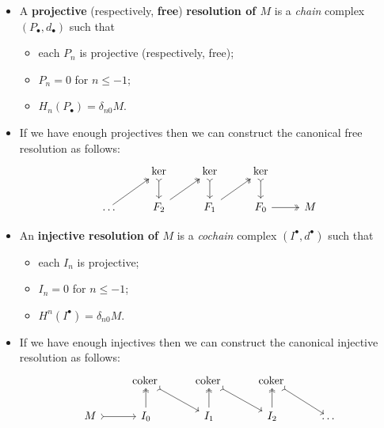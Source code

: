 \documentclass[10pt]{article}
\newcommand{\coker}{\mathrm{coker}\,}
\begin{document}
        \begin{itemize}
            \item A \textbf{projective} (respectively, \textbf{free}) \textbf{resolution of $M$} is a \emph{chain} complex $(P_\bullet,d_\bullet)$ such that
                \begin{itemize}
                    \item each $P_n$ is projective (respectively, free);
                    \item $P_n=0$ for $n\leqslant-1$;
                    \item $H_n(P_\bullet)=\delta_{n0}M$.
                \end{itemize}
            \item If we have enough projectives then we can construct the canonical free resolution as follows:
                \begin{equation*}
                    \begin{tikzcd}
                        & \ker \ar[tail]{d}  & \ker \ar[tail]{d} & \ker \ar[tail]{d} &\\
                        \ldots \ar[two heads]{ur} & F_2 \ar[two heads]{ur} & F_1 \ar[two heads]{ur} & F_0 \ar[two heads]{r} & M
                    \end{tikzcd}
                \end{equation*}
            \item An \textbf{injective resolution of $M$} is a \emph{cochain} complex $(I^\bullet,d^\bullet)$ such that
                \begin{itemize}
                    \item each $I_n$ is projective;
                    \item $I_n=0$ for $n\leqslant-1$;
                    \item $H^n(I^\bullet)=\delta_{n0}M$.
                \end{itemize}
            \item If we have enough injectives then we can construct the canonical injective resolution as follows:
                \begin{equation*}
                    \begin{tikzcd}
                        & \coker \ar[tail]{dr} & \coker \ar[tail]{dr} & \coker \ar[tail]{dr}\\
                        M \ar[tail]{r} & I_0 \ar[two heads]{u} & I_1 \ar[two heads]{u} & I_2 \ar[two heads]{u} & \ldots
                    \end{tikzcd}

\end{equation*}
\end{itemize}
\end{document}
